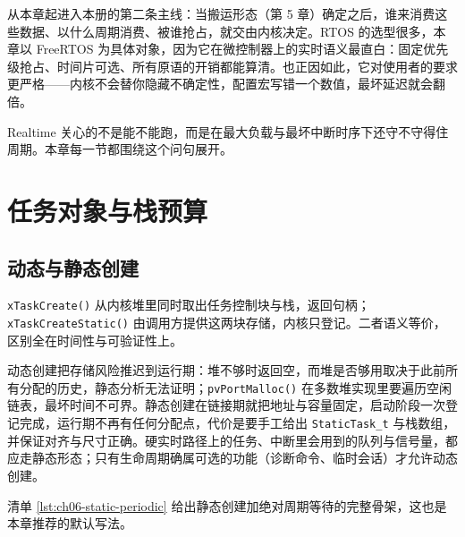 \documentclass[12pt,a4paper,fontset=fandol]{ctexbook}
\newcommand{\Fn}[1]{\texttt{#1()}}
\newcommand{\Tp}[1]{\texttt{#1}}
\newcommand{\Bk}{\discretionary{}{}{}}
\newcommand{\Lang}[1]{\textsf{#1}}
\newcommand{\DomRtos}{\Lang{RTOS}}
\newcommand{\DomRT}{\Lang{Realtime}}
\begin{document}
\label{ch:ch06-freertos}

从本章起进入本册的第二条主线：当搬运形态（第 5 章）确定之后，谁来消费这些数据、以什么周期消费、被谁抢占，就交由内核决定。\DomRtos{} 的选型很多，本章以 FreeRTOS 为具体对象，因为它在微控制器上的实时语义最直白：固定优先级抢占、时间片可选、所有原语的开销都能算清。也正因如此，它对使用者的要求更严格——内核不会替你隐藏不确定性，配置宏写错一个数值，最坏延迟就会翻倍。

\DomRT{} 关心的不是能不能跑，而是在最大负载与最坏中断时序下还守不守得住周期。本章每一节都围绕这个问句展开。

\section{任务对象与栈预算}

\subsection{动态与静态创建}

\Fn{xTaskCreate} 从内核堆里同时取出任务控制块与栈，返回句柄；\Fn{xTaskCreate{\Bk}Static} 由调用方提供这两块存储，内核只登记。二者语义等价，区别全在时间性与可验证性上。

\begin{compare}[title={动态创建与静态创建在硬实时项目里的差别}]
动态创建把存储风险推迟到运行期：堆不够时返回空，而堆是否够用取决于此前所有分配的历史，静态分析无法证明；\Fn{pvPortMalloc} 在多数堆实现里要遍历空闲链表，最坏时间不可界。静态创建在链接期就把地址与容量固定，启动阶段一次登记完成，运行期不再有任何分配点，代价是要手工给出 \Tp{StaticTask\_t} 与栈数组，并保证对齐与尺寸正确。硬实时路径上的任务、中断里会用到的队列与信号量，都应走静态形态；只有生命周期确属可选的功能（诊断命令、临时会话）才允许动态创建。
\end{compare}

清单 \ref{lst:ch06-static-periodic} 给出静态创建加绝对周期等待的完整骨架，这也是本章推荐的默认写法。
\end{document}
